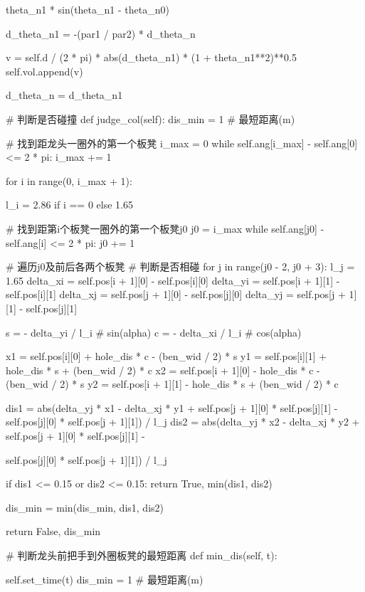 \documentclass[withoutpreface,bwprint]{cumcmthesis}
\begin{document}
\begin{CodeText}
                     theta_n1 * sin(theta_n1 - theta_n0)

          d_theta_n1 = -(par1 / par2) * d_theta_n

          v = self.d / (2 * pi) * abs(d_theta_n1) * (1 + theta_n1**2)**0.5
          self.vol.append(v)

          d_theta_n = d_theta_n1

# 判断是否碰撞
def judge_col(self):
   dis_min = 1 # 最短距离(m)

   # 找到距龙头一圈外的第一个板凳
   i_max = 0
   while self.ang[i_max] - self.ang[0] <= 2 * pi:
      i_max += 1

   for i in range(0, i_max + 1):

      l_i = 2.86 if i == 0 else 1.65

      # 找到距第i个板凳一圈外的第一个板凳j0
      j0 = i_max
      while self.ang[j0] - self.ang[i] <= 2 * pi:
          j0 += 1

      # 遍历j0及前后各两个板凳
      # 判断是否相碰
      for j in range(j0 - 2, j0 + 3):
          l_j = 1.65
          delta_xi = self.pos[i + 1][0] - self.pos[i][0]
          delta_yi = self.pos[i + 1][1] - self.pos[i][1]
          delta_xj = self.pos[j + 1][0] - self.pos[j][0]
          delta_yj = self.pos[j + 1][1] - self.pos[j][1]

          s = - delta_yi / l_i # sin(alpha)
          c = - delta_xi / l_i # cos(alpha)

          x1 = self.pos[i][0] + hole_dis * c - (ben_wid / 2) * s
          y1 = self.pos[i][1] + hole_dis * s + (ben_wid / 2) * c
          x2 = self.pos[i + 1][0] - hole_dis * c - (ben_wid / 2) * s
          y2 = self.pos[i + 1][1] - hole_dis * s + (ben_wid / 2) * c

          dis1 = abs(delta_yj * x1 - delta_xj * y1 + self.pos[j + 1][0] * self.pos[j][1] -
                     self.pos[j][0] * self.pos[j + 1][1]) / l_j
          dis2 = abs(delta_yj * x2 - delta_xj * y2 + self.pos[j + 1][0] * self.pos[j][1] -

                      self.pos[j][0] * self.pos[j + 1][1]) / l_j

            if dis1 <= 0.15 or dis2 <= 0.15:
                return True, min(dis1, dis2)

            dis_min = min(dis_min, dis1, dis2)

   return False, dis_min

# 判断龙头前把手到外圈板凳的最短距离
def min_dis(self, t):

   self.set_time(t)
   dis_min = 1 # 最短距离(m)


\end{CodeText}
\end{document}
